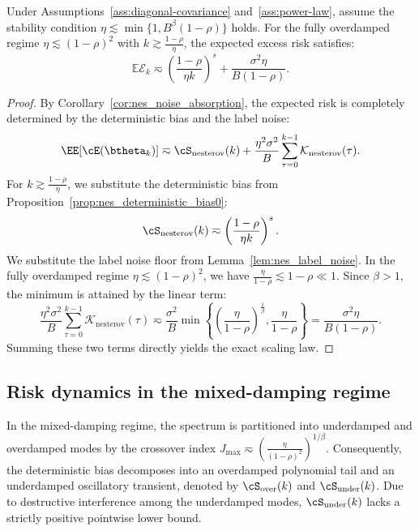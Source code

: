 \documentclass[11pt]{article}
\newcommand{\nesterov}{\mathrm{nesterov}}
\begin{document}
\begin{theorem}
\label{thm:nes_scaling_sgd}
Under Assumptions~\ref{ass:diagonal-covariance} and~\ref{ass:power-law},  assume the stability condition $\eta \lesssim \min\{1,B^\beta(1-\rho)\}$ holds. For the fully overdamped regime $\eta\lesssim(1-\rho)^2$ with $k \gtrsim \frac{1-\rho}{\eta}$, the expected excess risk satisfies:
\[
    \mathbb{E}\mathcal E_k
    \eqsim
    \left(\frac{1-\rho}{\eta k}\right)^s
    +
    \frac{\sigma^2\eta}{B(1-\rho)}.
\]
\end{theorem}
\begin{proof}
By Corollary~\ref{cor:nes_noise_absorption}, the expected risk is completely determined by the deterministic bias and the label noise:
\[
    \EE[\cE(\btheta_k)] \eqsim \cS_{\nesterov}(k) + \frac{\eta^2\sigma^2}{B}\sum_{\tau=0}^{k-1}\mathcal{K}_{\nesterov}(\tau).
\]
For $k \gtrsim \frac{1-\rho}{\eta}$, we substitute the deterministic bias from Proposition~\ref{prop:nes_deterministic_bias0}:
\[
    \cS_{\nesterov}(k) \eqsim \left(\frac{1-\rho}{\eta k}\right)^s.
\]
We substitute the label noise floor from Lemma~\ref{lem:nes_label_noise}. In the fully overdamped regime $\eta \lesssim (1-\rho)^2$, we have $\frac{\eta}{1-\rho} \lesssim 1-\rho \ll 1$. Since $\beta > 1$, the minimum is attained by the linear term:
\[
    \frac{\eta^2\sigma^2}{B}\sum_{\tau=0}^{k-1}\mathcal{K}_{\nesterov}(\tau) \eqsim \frac{\sigma^2}{B} \min\left\{ \left(\frac{\eta}{1-\rho}\right)^{\frac1\beta}, \frac{\eta}{1-\rho} \right\} = \frac{\sigma^2\eta}{B(1-\rho)}.
\]
Summing these two terms directly yields the exact scaling law.
\end{proof}



\subsection{Risk dynamics in the mixed-damping regime}
\label{app:nes_mixed_loss}


In the mixed-damping regime, the spectrum is partitioned into underdamped and overdamped modes by the crossover index $J_{\max} \eqsim \left(\frac{\eta}{(1-\rho)^2}\right)^{1/\beta}$. Consequently, the deterministic bias decomposes into an overdamped polynomial tail and an underdamped oscillatory transient, denoted by $\cS_{\mathrm{over}}(k)$ and $\cS_{\mathrm{under}}(k)$. Due to destructive interference among the underdamped modes, $\cS_{\mathrm{under}}(k)$ lacks a strictly positive pointwise lower bound. 
\end{document}
